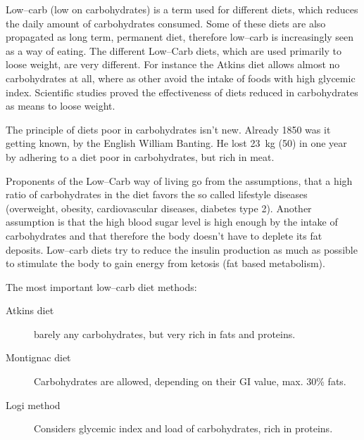 \documentclass[../main.tex]{subfiles}
\begin{document}
Low--carb (low on carbohydrates) is a term used for different diets, which reduces the daily amount of carbohydrates consumed.
Some of these diets are also propagated as long term, permanent diet, therefore low--carb is increasingly seen as a way of  eating.
The different Low--Carb diets, which are used primarily to loose weight, are very different.
For instance the Atkins diet allows almost no carbohydrates at all, where as other avoid the intake of foods with high glycemic index.
Scientific studies proved the effectiveness of diets reduced in carbohydrates as means to loose weight.

The principle of diets poor in carbohydrates isn't new.
Already 1850 was it getting known, by the English William Banting.
He lost \SI{23}{\kilo\gram} (\SI{50}{\lbs}) in one year by adhering to a diet poor in carbohydrates, but rich in meat.

Proponents of the Low--Carb way of living go from the assumptions, that a high ratio of carbohydrates in the diet favors the so called
lifestyle diseases (overweight, obesity, cardiovascular diseases, diabetes type 2).
Another assumption is that the high blood sugar level is high enough by the intake of carbohydrates and that therefore
the body doesn't have to deplete its fat deposits.
Low--carb diets try to reduce the insulin production as much as possible to stimulate the body to gain energy from ketosis
(fat based metabolism).

The most important low--carb diet methods:
\begin{description}
\item[Atkins diet] barely any carbohydrates, but very rich in fats and proteins.
\item[Montignac diet] Carbohydrates are allowed, depending on their GI value, max. 30\% fats.
\item[Logi method] Considers glycemic index and load of carbohydrates, rich in proteins.
\end{description}
\end{document}
